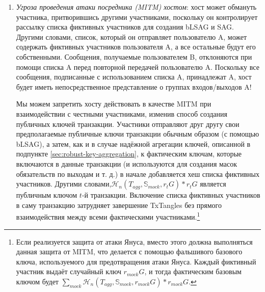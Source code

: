 \begin{enumerate}
    \item {\em Угроза проведения атаки посредника (MITM) хостом}: хост может обмануть участника, притворившись другими участниками, поскольку он контролирует рассылку списка фиктивных участников для создания bLSAG и SAG. Другими словами, список, который он отправляет пользователю A, может содержать фиктивных участников пользователя A, а все остальные будут его собственными. Сообщения, получаемые пользователем B, отклоняются при помощи списка A перед повторной передачей пользователю A. Поскольку все сообщения, подписанные с использованием списка A, принадлежат A, хост будет иметь непосредственное представление о группах входов/выходов A!
    
    Мы можем запретить хосту действовать в качестве MITM при взаимодействии с честны\-ми участниками, изменив способ создания публичных ключей транзакции. Участники отправляют друг другу свои предполагаемые публичные ключи транзакции обычным образом (с помощью bLSAG), а затем, как и в случае надёжной агрегации ключей, описанной в подпункте \ref{sec:robust-key-aggregation}, к фактическим ключам, которые включаются в данные транзакции (и используются для создания масок обязательств по выходам и т. д.) в начале добавляется хеш списка фиктивных участников. Другими словами,\linebreak $\mathcal{H}_n(T_{agg},\mathbb{S}_{mock},r_t G)*r_t G$ является публичным ключом $t$-й транзакции. Включение списка фиктивных участников в саму транзакцию затрудняет завершение TxTangles без прямого взаимодействия между всеми фактическими участниками.\footnote{Если реализуется защита от атаки Януса, вместо этого должна выполняться данная защита от MITM, что делается с помощью фальшивого базового ключа, используемого для предотвращения атаки Януса. Каждый фиктивный участник выдаёт случайный ключ $r_{mock} G$, и тогда фактическим базовым ключом будет $\sum_{mock} \mathcal{H}_n(T_{agg},\mathbb{S}_{mock},r_{mock} G)*r_{mock} G$.}%
\end{enumerate}
